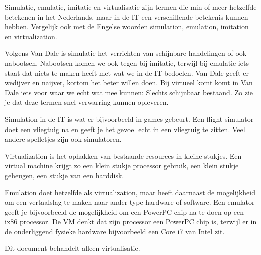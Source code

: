 Simulatie, emulatie, imitatie en virtualisatie zijn termen die min of meer hetzelfde betekenen in het Nederlands, maar in de IT een verschillende betekenis kunnen hebben. Vergelijk ook met de Engelse woorden simulation, emulation, imitation en virtualization.

Volgens Van Dale is simulatie het verrichten van schijnbare handelingen of ook nabootsen. Nabootsen komen we ook tegen bij imitatie, terwijl bij emulatie iets staat dat niets te maken heeft met wat we in de IT bedoelen. Van Dale geeft er wedijver en naijver, kortom het beter willen doen. Bij virtueel komt komt in Van Dale iets voor waar we echt wat mee kunnen: Slechts schijnbaar bestaand. Zo zie je dat deze termen snel verwarring kunnen opleveren.

Simulation in de IT is wat er bijvoorbeeld in games gebeurt. Een flight simulator doet een vliegtuig na en geeft je het gevoel echt in een vliegtuig te zitten. Veel andere spelletjes zijn ook simulatoren.

Virtualization is het ophakken van bestaande resources in kleine stukjes. Een virtual machine krijgt zo een klein stukje processor gebruik, een klein stukje geheugen, een stukje van een harddisk. 

Emulation doet hetzelfde als virtualization, maar heeft daarnaast de mogelijkheid om een vertaalslag te maken naar ander type hardware of software. Een emulator geeft je bijvoorbeeld de mogelijkheid om een PowerPC chip na te doen op een ix86 processor. De VM denkt dat zijn processor een PowerPC chip is, terwijl er in de onderliggend fysieke hardware bijvoorbeeld een Core i7 van Intel zit.

Dit document behandelt alleen virtualisatie.
